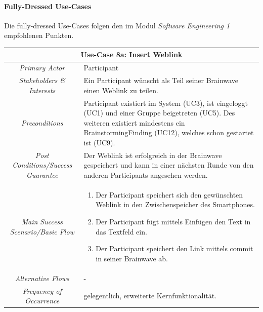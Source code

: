 \paragraph{Fully-Dressed Use-Cases}\label{par:fully-dressed-uc}

Die fully-dressed Use-Cases folgen den im Modul \textit{Software Engineering 1} empfohlenen Punkten.
\renewcommand{\arraystretch}{1.35}
\begin{center}
	\begin{longtable}{| c | p{7cm} |}
		\hline
		\multicolumn{2}{|c|}{\textbf{Use-Case 8a: Insert Weblink}}\\
		\hline\hline
		\textit{Primary Actor} & Participant\\
		\hline
		\textit{Stakeholders \& Interests} & Ein Participant wünscht als Teil seiner Brainwave einen Weblink zu teilen. \\
		\hline
		\textit{Preconditions} & Participant existiert im System (UC3), ist eingeloggt (UC1) und einer Gruppe beigetreten (UC5). Des weiteren existiert mindestens ein BrainstormingFinding (UC12), welches schon gestartet ist (UC9).\\
		\hline
		\textit{Post Conditions/Success Guarantee} & Der Weblink ist erfolgreich in der Brainwave gespeichert und kann in einer nächsten Runde von den anderen Participants angesehen werden.\\
		\hline
		\textit{Main Success Scenario/Basic Flow} & 
		\begin{enumerate}[noitemsep]
			\item Der Participant speichert sich den gewünschten Weblink in den Zwischenspeicher des Smartphones.
			\item Der Participant fügt mittels Einfügen den Text in das Textfeld ein.
			\item Der Participant speichert den Link mittels commit in seiner Brainwave ab.
		\end{enumerate}\\
		\hline
		\textit{Alternative Flows} &
		-\\
		\hline
		\textit{Frequency of Occurrence} & gelegentlich, erweiterte Kernfunktionalität.\\
		\hline
	\end{longtable}
\end{center}

